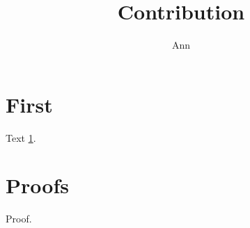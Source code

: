 \documentclass{svmult}
\begin{document}
\title{Contribution}
\author{Ann}
\maketitle
\section{First}\label{f}
Text \ref{f}.
\appendix
\section{Proofs}
Proof.
\end{document}

